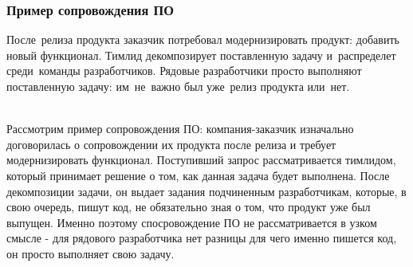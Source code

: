 \documentclass{../industrial-development}
\begin{document}
\begin{frame} \frametitle{Пример сопровождения ПО}
	После~релиза продукта заказчик потребовал модернизировать продукт: добавить новый функционал. Тимлид декомпозирует поставленную задачу и~распределет среди~команды разработчиков. Рядовые разработчики просто выполняют поставленную задачу: им~не~важно был уже~релиз продукта или~нет.
\end{frame}
\lecturenotes
\\Рассмотрим пример сопровождения ПО: компания-заказчик изначально договорилась о сопровождении их продукта после релиза и требует модернизировать функционал. Поступивший запрос рассматривается тимлидом, который принимает решение о том, как данная задача будет выполнена. После декомпозиции задачи, он выдает задания подчиненным разработчикам, которые, в свою очередь, пишут код, не обязательно зная о том, что продукт уже был выпущен. Именно поэтому спосровождение ПО не рассматривается в узком смысле - для рядового разработчика нет разницы для чего именно пишется код, он просто выполняет свою задачу.
\end{document}
